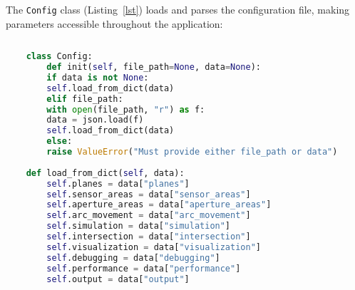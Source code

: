 The \texttt{Config} class (Listing~\ref{lst}) loads and parses the configuration file, making parameters accessible throughout the application:
\begin{lstlisting}[style=pythonstyle, caption=Model configuration - Config Class, label=lst:pythonCodeApp, language=Python ]
    
    class Config:
        def init(self, file_path=None, data=None):
        if data is not None:
        self.load_from_dict(data)
        elif file_path:
        with open(file_path, "r") as f:
        data = json.load(f)
        self.load_from_dict(data)
        else:
        raise ValueError("Must provide either file_path or data")
    
    def load_from_dict(self, data):
        self.planes = data["planes"]
        self.sensor_areas = data["sensor_areas"]
        self.aperture_areas = data["aperture_areas"]
        self.arc_movement = data["arc_movement"]
        self.simulation = data["simulation"]
        self.intersection = data["intersection"]
        self.visualization = data["visualization"]
        self.debugging = data["debugging"]
        self.performance = data["performance"]
        self.output = data["output"]
    \end{lstlisting}